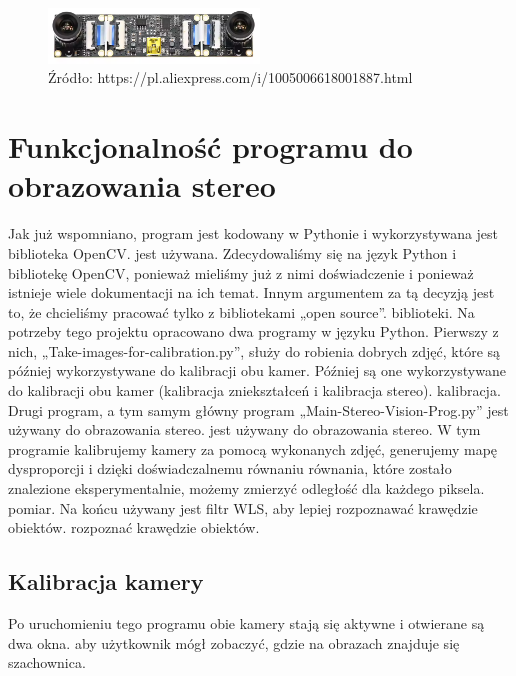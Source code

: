 \documentclass[magisterska]{pracadypl}
\begin{document}
\begin{figure}[h]  %
    \centering  %
    \includegraphics[width=0.5\textwidth]{images/MAINSTEREO.png}  %
    \captionsetup{labelformat=empty, font=footnotesize}
    \caption{Źródło: https://pl.aliexpress.com/i/1005006618001887.html}
    \label{fig:mono}  %
\end{figure}

\section{Funkcjonalność programu do obrazowania stereo}

Jak już wspomniano, program jest kodowany w Pythonie i wykorzystywana jest biblioteka OpenCV.
jest używana. Zdecydowaliśmy się na język Python i bibliotekę OpenCV, ponieważ
mieliśmy już z nimi doświadczenie i ponieważ istnieje wiele dokumentacji na ich temat. Innym
argumentem za tą decyzją jest to, że chcieliśmy pracować tylko z bibliotekami „open source”.
biblioteki.
Na potrzeby tego projektu opracowano dwa programy w języku Python.
Pierwszy z nich, „Take-images-for-calibration.py”, służy do robienia dobrych zdjęć, które są później wykorzystywane do kalibracji obu kamer.
Później są one wykorzystywane do kalibracji obu kamer (kalibracja zniekształceń i kalibracja stereo).
kalibracja.
Drugi program, a tym samym główny program „Main-Stereo-Vision-Prog.py” jest używany do obrazowania stereo.
jest używany do obrazowania stereo. W tym programie kalibrujemy kamery za pomocą wykonanych zdjęć, generujemy mapę dysproporcji i dzięki doświadczalnemu równaniu
równania, które zostało znalezione eksperymentalnie, możemy zmierzyć odległość dla każdego piksela.
pomiar. Na końcu używany jest filtr WLS, aby lepiej rozpoznawać krawędzie obiektów.
rozpoznać krawędzie obiektów.

\subsection{Kalibracja kamery}

Po uruchomieniu tego programu obie kamery stają się aktywne i otwierane są dwa okna.
aby użytkownik mógł zobaczyć, gdzie na obrazach znajduje się szachownica.
\end{document}
